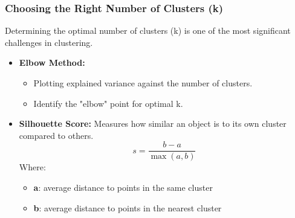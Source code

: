 \documentclass[aspectratio=169]{beamer}
\begin{document}
\begin{frame}[fragile]
  \frametitle{Choosing the Right Number of Clusters (k)}
  Determining the optimal number of clusters (k) is one of the most significant challenges in clustering. 

  \begin{itemize}
    \item \textbf{Elbow Method:} 
      \begin{itemize}
        \item Plotting explained variance against the number of clusters.
        \item Identify the "elbow" point for optimal k.
      \end{itemize}
    \item \textbf{Silhouette Score:} Measures how similar an object is to its own cluster compared to others.
      \begin{equation}
        s = \frac{b - a}{\max(a, b)} 
      \end{equation}
      Where:
      \begin{itemize}
        \item \textbf{a}: average distance to points in the same cluster
        \item \textbf{b}: average distance to points in the nearest cluster
      \end{itemize}
  \end{itemize}
\end{frame}
\end{document}
